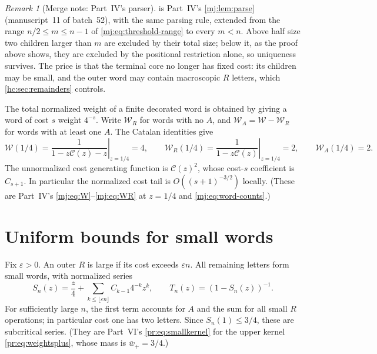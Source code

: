 \documentclass[11pt,a4paper]{article}
\theoremstyle{definition}\newaliascnt{definition}{theorem}
\theoremstyle{remark}\newaliascnt{remark}{theorem}
\newtheorem{remark}[remark]{Remark}
\newcommand{\Cat}{\mathcal C}
\begin{document}
\begin{remark}[Merge note: Part~IV's parser]
 is Part~IV's \cref{mj:lem:parse} (manuscript~11 of
batch~52), with the same parsing rule, extended from the range
$n/2\le m\le n-1$ of \eqref{mj:eq:threshold-range} to every $m<n$. Above
half size two children larger than $m$ are excluded by their total size;
below it, as the proof above shows, they are excluded by the positional
restriction alone, so uniqueness survives. The price is that the terminal
core no longer has fixed cost: its children may be small, and the outer word
may contain macroscopic $R$ letters, which \cref{hc:sec:remainders}
controls.
\end{remark}

The total normalized weight of a finite decorated word is obtained by giving
a word of cost $s$ weight $4^{-s}$. Write $\mathcal W_R$ for words with no
$A$, and $\mathcal W_A=\mathcal W-\mathcal W_R$ for words with at least one
$A$. The Catalan identities give
\begin{equation}\label{hc:eq:masses}
 \mathcal W(1/4)=\left.\frac1{1-z\Cat(z)-z}\right|_{z=1/4}=4,
 \qquad \mathcal W_R(1/4)=\left.\frac1{1-z\Cat(z)}\right|_{z=1/4}=2,
 \qquad \mathcal W_A(1/4)=2.
\end{equation}
The unnormalized cost generating function is $\Cat(z)^2$, whose cost-$s$
coefficient is $C_{s+1}$. In particular the normalized cost tail is
$O((s+1)^{-3/2})$ locally. (These are Part~IV's
\eqref{mj:eq:W}--\eqref{mj:eq:WR} at $z=1/4$ and
\eqref{mj:eq:word-counts}.)

\section{Uniform bounds for small words}
\label{hc:sec:smallwords}
Fix $\varepsilon>0$. An outer $R$ is large if its cost exceeds
$\varepsilon n$. All remaining letters form small words, with normalized
series
\[
 S_n(z)=\frac z4+\sum_{k\le\lfloor\varepsilon n\rfloor}
 C_{k-1}4^{-k}z^k,\qquad T_n(z)=(1-S_n(z))^{-1}.
\]
For sufficiently large $n$, the first term accounts for $A$ and the sum for
all small $R$ operations; in particular cost one has two letters. Since
$S_n(1)\le3/4$, these are subcritical series. (They are Part~VI's
\eqref{pr:eq:smallkernel} for the upper kernel \eqref{pr:eq:weightsplus},
whose mass is $\bar w_+=3/4$.)
\end{document}
